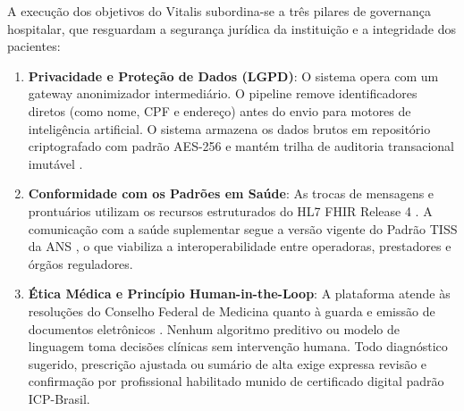 A execução dos objetivos do Vitalis subordina-se a três pilares de governança hospitalar, que resguardam a segurança jurídica da instituição e a integridade dos pacientes:

\begin{enumerate}[leftmargin=*]
    \item \textbf{Privacidade e Proteção de Dados (LGPD)}: O sistema opera com um gateway anonimizador intermediário. O pipeline remove identificadores diretos (como nome, CPF e endereço) antes do envio para motores de inteligência artificial. O sistema armazena os dados brutos em repositório criptografado com padrão AES-256 e mantém trilha de auditoria transacional imutável \cite{brasil_lgpd:2018}.
    \item \textbf{Conformidade com os Padrões em Saúde}: As trocas de mensagens e prontuários utilizam os recursos estruturados do HL7 FHIR Release 4 \cite{hl7_fhir:2019}. A comunicação com a saúde suplementar segue a versão vigente do Padrão TISS da ANS \cite{ans_tiss:2023}, o que viabiliza a interoperabilidade entre operadoras, prestadores e órgãos reguladores.
    \item \textbf{Ética Médica e Princípio Human-in-the-Loop}: A plataforma atende às resoluções do Conselho Federal de Medicina quanto à guarda e emissão de documentos eletrônicos \cite{cfm_prontuario:2007,cfm_digital:2021}. Nenhum algoritmo preditivo ou modelo de linguagem toma decisões clínicas sem intervenção humana. Todo diagnóstico sugerido, prescrição ajustada ou sumário de alta exige expressa revisão e confirmação por profissional habilitado munido de certificado digital padrão ICP-Brasil.
\end{enumerate}
